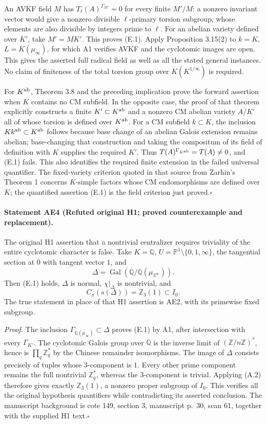 An AVKF field $M$ has $T_\ell(A)^{\Gamma_{M'}}=0$ for every finite $M'/M$: a nonzero invariant vector would give a nonzero divisible $\ell$-primary torsion subgroup, whose elements are also divisible by integers prime to $\ell$. For an abelian variety defined over $K'$, take $M'=MK'$. This proves (E.1). Apply Proposition 3.15(2) to $k=K$, $L=K(\mu_\infty)$, for which A1 verifies AVKF and the cyclotomic images are open. This gives the asserted full radical field as well as all the stated general instances. No claim of finiteness of the total torsion group over $K(K^{1/\infty})$ is required.

For $K^{\rm ab}$, Theorem 3.8 and the preceding implication prove the forward assertion when $K$ contains no CM subfield. In the opposite case, the proof of that theorem explicitly constructs a finite $K'\subset K^{\rm ab}$ and a nonzero CM abelian variety $A/K'$ all of whose torsion is defined over $K^{\rm ab}$. For a CM subfield $k\subset K$, the inclusion $Kk^{\rm ab}\subset K^{\rm ab}$ follows because base change of an abelian Galois extension remains abelian; base-changing that construction and taking the compositum of its field of definition with $K$ supplies the required $K'$. Thus $T(A)^{\Gamma_{K^{\rm ab}}}=T(A)\ne0$, and (E.1) fails. This also identifies the required finite extension in the failed universal quantifier. The fixed-variety criterion quoted in that source from Zarhin's Theorem 1 concerns $K$-simple factors whose CM endomorphisms are defined over $K$; the quantified assertion (E.1) is the field criterion just proved.\hfill$\square$

\paragraph{Statement AE4 (Refuted original H1; proved counterexample and replacement).}\label{res:AE4}
The original H1 assertion that a nontrivial centralizer requires triviality of the entire cyclotomic character is false. Take $K=\mathbb Q$, $U=\mathbb P^1\setminus\{0,1,\infty\}$, the tangential section at $0$ with tangent vector $1$, and
\[
 \Delta=\operatorname{Gal}(\overline{\mathbb Q}/\mathbb Q(\mu_{3^\infty})).
\]
Then (E.1) holds, $\Delta$ is normal, $\chi|_\Delta$ is nontrivial, and
\[
 C_\pi(s(\Delta))=\mathbb Z_3(1)\subset I_0.
\]
The true statement in place of that H1 assertion is AE2, with its primewise fixed subgroup.

\emph{Proof.} The inclusion $\Gamma_{\mathbb Q(\mu_\infty)}\subset\Delta$ proves (E.1) by A1, after intersection with every $\Gamma_{K'}$. The cyclotomic Galois group over $\mathbb Q$ is the inverse limit of $(\mathbb Z/n\mathbb Z)^*$, hence is $\prod_q\mathbb Z_q^*$ by the Chinese remainder isomorphisms. The image of $\Delta$ consists precisely of tuples whose $3$-component is $1$. Every other prime component remains the full nontrivial $\mathbb Z_q^*$, whereas the $3$-component is trivial. Applying (A.2) therefore gives exactly $\mathbb Z_3(1)$, a nonzero proper subgroup of $I_0$. This verifies all the original hypothesis quantifiers while contradicting its asserted conclusion. The manuscript background is cote 149, section 3, manuscript p.~30, scan 61, together with the supplied H1 text.\hfill$\square$

